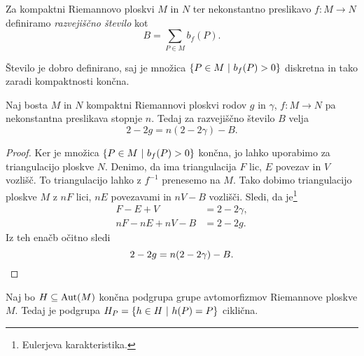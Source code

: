 \begin{definicija}
Za kompaktni Riemannovo ploskvi $M$ in $N$ ter nekonstantno
preslikavo $f \colon M \to N$ definiramo
\emph{razvejiščno število} kot
\[
B = \sum_{P \in M} b_f(P).
\]
\end{definicija}

Število je dobro definirano, saj je množica
$\left\{P \in M~\middle\vert~b_f(P) > 0\right\}$ diskretna in tako zaradi kompaktnosti
končna.

\begin{izrek}
\label{iz:rie-hur}
Naj bosta $M$ in $N$ kompaktni Riemannovi ploskvi rodov $g$ in
$\gamma$, $f \colon M \to N$ pa nekonstantna preslikava stopnje
$n$. Tedaj za razvejiščno število $B$ velja
\[
2 - 2g = n(2 - 2 \gamma) - B.
\]
\end{izrek}

\begin{proof}
Ker je množica $\left\{P \in M~\middle\vert~b_f(P) > 0\right\}$ končna, jo lahko
uporabimo za triangulacijo ploskve $N$. Denimo, da ima
triangulacija $F$ lic, $E$ povezav in $V$ vozlišč. To
triangulacijo lahko z $f^{-1}$ prenesemo na $M$. Tako dobimo
triangulacijo ploskve $M$ z $nF$ lici, $nE$ povezavami in $nV - B$
vozlišči. Sledi, da je\footnote{Eulerjeva karakteristika.}
\begin{align*}
F - E + V &= 2 - 2 \gamma,
\\
nF - nE + nV - B &= 2 - 2g.
\end{align*}
Iz teh enačb očitno sledi
\[
2 - 2g = n(2 - 2 \gamma) - B. \qedhere
\]
\end{proof}

\begin{trditev}
Naj bo $H \subseteq \operatorname{Aut}(M)$ končna podgrupa grupe avtomorfizmov
Riemannove ploskve $M$. Tedaj je podgrupa
$H_P = \left\{h \in H~\middle\vert~h(P) = P\right\}$ ciklična.
\end{trditev}

